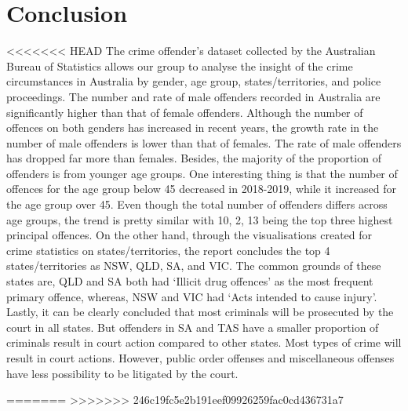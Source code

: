 \documentclass[11pt,a4paper,]{article}
\begin{document}
\hypertarget{conclusion}{%
\section{Conclusion}\label{conclusion}}

<<<<<<< HEAD
The crime offender's dataset collected by the Australian Bureau of Statistics allows our group to analyse the insight of the crime circumstances in Australia by gender, age group, states/territories, and police proceedings. The number and rate of male offenders recorded in Australia are significantly higher than that of female offenders. Although the number of offences on both genders has increased in recent years, the growth rate in the number of male offenders is lower than that of females. The rate of male offenders has dropped far more than females. Besides, the majority of the proportion of offenders is from younger age groups. One interesting thing is that the number of offences for the age group below 45 decreased in 2018-2019, while it increased for the age group over 45. Even though the total number of offenders differs across age groups, the trend is pretty similar with 10, 2, 13 being the top three highest principal offences. On the other hand, through the visualisations created for crime statistics on states/territories, the report concludes the top 4 states/territories as NSW, QLD, SA, and VIC. The common grounds of these states are, QLD and SA both had `Illicit drug offences' as the most frequent primary offence, whereas, NSW and VIC had `Acts intended to cause injury'. Lastly, it can be clearly concluded that most criminals will be prosecuted by the court in all states. But offenders in SA and TAS have a smaller proportion of criminals result in court action compared to other states. Most types of crime will result in court actions. However, public order offenses and miscellaneous offenses have less possibility to be litigated by the court.

=======
>>>>>>> 246c19fc5e2b191eef09926259fac0cd436731a7
\printbibliography[title=Reference]
\end{document}
